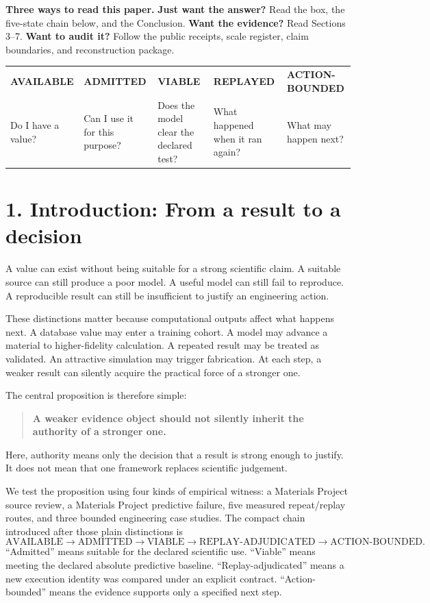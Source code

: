 \documentclass[10pt,a4paper]{article}
\begin{document}
\noindent\textbf{Three ways to read this paper.} \textbf{Just want the answer?} Read the box, the five-state chain below, and the Conclusion. \textbf{Want the evidence?} Read Sections 3--7. \textbf{Want to audit it?} Follow the public receipts, scale register, claim boundaries, and reconstruction package.

\begin{center}\small
\begin{tabularx}{0.98\linewidth}{@{}>{\centering\arraybackslash}X>{\centering\arraybackslash}X>{\centering\arraybackslash}X>{\centering\arraybackslash}X>{\centering\arraybackslash}X@{}}
\textbf{AVAILABLE} & \textbf{ADMITTED} & \textbf{VIABLE} & \textbf{REPLAYED} & \textbf{ACTION-BOUNDED}\\
Do I have a value? & Can I use it for this purpose? & Does the model clear the declared test? & What happened when it ran again? & What may happen next?\\
\end{tabularx}
\end{center}

\section{1. Introduction: From a result to a decision}
A value can exist without being suitable for a strong scientific claim. A suitable source can still produce a poor model. A useful model can still fail to reproduce. A reproducible result can still be insufficient to justify an engineering action.

These distinctions matter because computational outputs affect what happens next. A database value may enter a training cohort. A model may advance a material to higher-fidelity calculation. A repeated result may be treated as validated. An attractive simulation may trigger fabrication. At each step, a weaker result can silently acquire the practical force of a stronger one.

The central proposition is therefore simple:
\begin{quote}\textbf{A weaker evidence object should not silently inherit the authority of a stronger one.}\end{quote}
Here, authority means only the decision that a result is strong enough to justify. It does not mean that one framework replaces scientific judgement.

We test the proposition using four kinds of empirical witness: a Materials Project source review, a Materials Project predictive failure, five measured repeat/replay routes, and three bounded engineering case studies. The compact chain introduced after those plain distinctions is
\[
\mathrm{AVAILABLE}\rightarrow\mathrm{ADMITTED}\rightarrow\mathrm{VIABLE}
\rightarrow\mathrm{REPLAY\!\mbox{-}ADJUDICATED}\rightarrow\mathrm{ACTION\!\mbox{-}BOUNDED}.
\]
``Admitted'' means suitable for the declared scientific use. ``Viable'' means meeting the declared absolute predictive baseline. ``Replay-adjudicated'' means a new execution identity was compared under an explicit contract. ``Action-bounded'' means the evidence supports only a specified next step.
\end{document}

